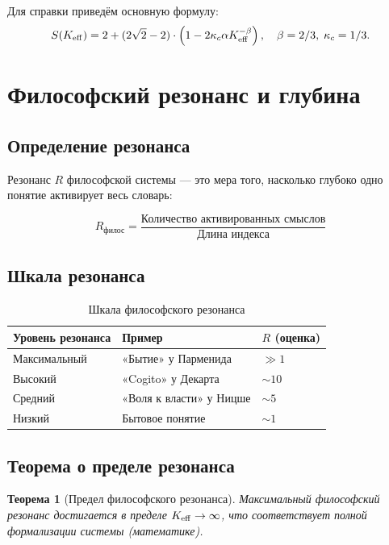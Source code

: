\documentclass[12pt,a4paper]{article}
\newcommand{\kappac}{\kappa_c}
\newcommand{\betaf}{\beta}
\newtheorem{theorem}{Теорема}[section]
\begin{document}
	Для справки приведём основную формулу:
	\[
	S(\Keff) = 2 + (2\sqrt{2} - 2) \cdot \left(1 - 2\kappac \alpha \Keff^{-\betaf}\right), \quad \betaf=2/3,\; \kappac=1/3.
	\]
	
	\section{Философский резонанс и глубина}
	
	\subsection{Определение резонанса}
	
	Резонанс \(R\) философской системы — это мера того, насколько глубоко одно понятие активирует весь словарь:
	
	\begin{equation}
		R_{\text{филос}} = \frac{\text{Количество активированных смыслов}}{\text{Длина индекса}}
	\end{equation}
	
	\subsection{Шкала резонанса}
	
	\begin{table}[H]
		\centering
		\caption{Шкала философского резонанса}
		\begin{tabular}{p{4cm}p{5cm}p{5cm}}
			\toprule
			\textbf{Уровень резонанса} & \textbf{Пример} & \textbf{\(R\) (оценка)} \\
			\midrule
			Максимальный & «Бытие» у Парменида & \(\gg 1\) \\
			Высокий & «Cogito» у Декарта & \(\sim 10\) \\
			Средний & «Воля к власти» у Ницше & \(\sim 5\) \\
			Низкий & Бытовое понятие & \(\sim 1\) \\
			\bottomrule
		\end{tabular}
	\end{table}
	
	\subsection{Теорема о пределе резонанса}
	
	\begin{theorem}[Предел философского резонанса]
		Максимальный философский резонанс достигается в пределе \(\Keff \to \infty\), что соответствует полной формализации системы (математике).
	\end{theorem}
	
\end{document}
